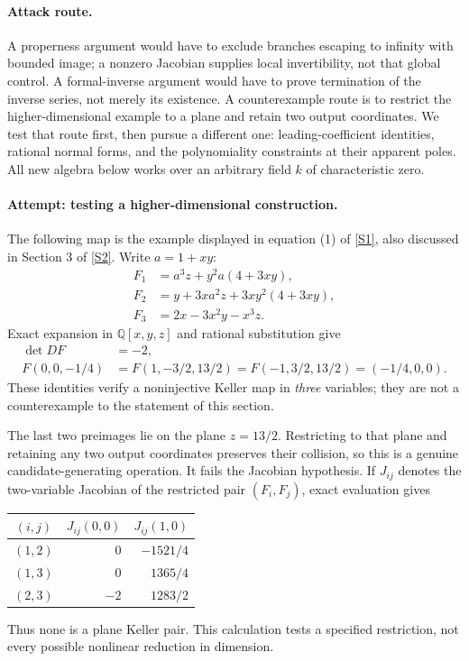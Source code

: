 \documentclass[11pt]{article}
\newcommand{\Q}{\mathbb{Q}}
\newcommand{\sref}[2]{\hyperlink{source:#1:#2}{[S#2]}}
\begin{document}
\paragraph{Attack route.}
A properness argument would have to exclude branches escaping to infinity
with bounded image; a nonzero Jacobian supplies local invertibility, not that
global control. A formal-inverse argument would have to prove termination of
the inverse series, not merely its existence. A counterexample route is to
restrict the higher-dimensional example to a plane and retain two output
coordinates. We test that route first, then pursue a different one:
leading-coefficient identities, rational normal forms, and the polynomiality
constraints at their apparent poles. All new algebra below works over an
arbitrary field $k$ of characteristic zero.

\paragraph{Attempt: testing a higher-dimensional construction.}
The following map is the example displayed in equation (1) of
\sref{30006729}{1}, also discussed in Section 3 of \sref{30006729}{2}. Write $a=1+xy$:
\begin{equation}\label{ra30006729:threeD}
 \begin{aligned}
 F_1&=a^3z+y^2a(4+3xy),\\
 F_2&=y+3xa^2z+3xy^2(4+3xy),\\
 F_3&=2x-3x^2y-x^3z.
 \end{aligned}
\end{equation}
Exact expansion in $\Q[x,y,z]$ and rational substitution give
\begin{align*}
 \det DF&=-2,\\
 F(0,0,-1/4)&=F(1,-3/2,13/2)=F(-1,3/2,13/2)
              =(-1/4,0,0).
\end{align*}
These identities verify a noninjective Keller map in \emph{three} variables;
they are not a counterexample to the statement of this section.

The last two preimages lie on the plane $z=13/2$. Restricting to that plane
and retaining any two output coordinates preserves their collision, so this
is a genuine candidate-generating operation. It fails the Jacobian
hypothesis. If $J_{ij}$ denotes the two-variable Jacobian of the restricted
pair $(F_i,F_j)$, exact evaluation gives
\begin{center}
\begin{tabular}{c|r r}
$(i,j)$ & $J_{ij}(0,0)$ & $J_{ij}(1,0)$\\
\hline
$(1,2)$ & $0$ & $-1521/4$\\
$(1,3)$ & $0$ & $1365/4$\\
$(2,3)$ & $-2$ & $1283/2$
\end{tabular}
\end{center}
Thus none is a plane Keller pair. This calculation tests a specified
restriction, not every possible nonlinear reduction in dimension.
\end{document}
